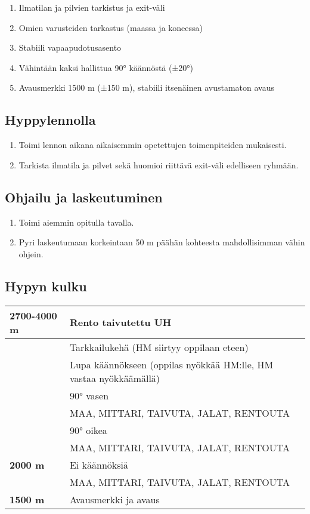 \begin{multicols}{2}
\begin{enumerate}[label=\bfseries \arabic*)]
\item  Ilmatilan ja pilvien tarkistus ja exit-väli  
\item  Omien varusteiden tarkastus (maassa ja koneessa) 
\item  Stabiili vapaapudotusasento 
\item  Vähintään kaksi hallittua 90° käännöstä (±20°) 
\item  Avausmerkki 1500 m (±150 m), stabiili itsenäinen avustamaton avaus  
\end{enumerate}
\subsection{ Hyppylennolla }
\label{nova-alkeiskoulutuksen-suoritukset-hyppylennolla}

\begin{enumerate}[label=\bfseries \arabic*)]
\item  Toimi lennon aikana aikaisemmin opetettujen toimenpiteiden mukaisesti. 
\item  Tarkista ilmatila ja pilvet sekä huomioi riittävä exit-väli edelliseen ryhmään. 
\end{enumerate}
\subsection{ Ohjailu ja laskeutuminen }
\label{nova-alkeiskoulutuksen-suoritukset-ohjailu-ja-laskeutuminen}

\begin{enumerate}[label=\bfseries \arabic*)]
\item  Toimi aiemmin opitulla tavalla. 
\item  Pyri laskeutumaan korkeintaan 50 m päähän kohteesta mahdollisimman vähin ohjein. 
\end{enumerate}
\subsection{ Hypyn kulku }
\label{nova-alkeiskoulutuksen-suoritukset-hypyn-kulku}

\begin{tabular}[]{|l|p{4.7cm}|}
\hline
 \textbf{2700-4000 m} &  Rento taivutettu UH
\\ \hline
  &  Tarkkailukehä (HM siirtyy oppilaan eteen)
\\ \hline
  &  Lupa käännökseen (oppilas nyökkää HM:lle, HM vastaa nyökkäämällä)
\\ \hline
  &  90° vasen
\\ \hline
  &  MAA, MITTARI, TAIVUTA, JALAT, RENTOUTA
\\ \hline
  &  90° oikea
\\ \hline
  &  MAA, MITTARI, TAIVUTA, JALAT, RENTOUTA
\\ \hline
 \textbf{2000 m} &  Ei käännöksiä
\\ \hline
  &  MAA, MITTARI, TAIVUTA, JALAT, RENTOUTA
\\ \hline
 \textbf{1500 m} &  Avausmerkki ja avaus
\\ \hline
\end{tabular}


\end{multicols}
